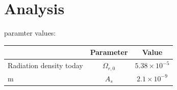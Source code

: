 \section{Analysis}

paramter values:
\begin{center}
    \begin{tabular}{lc|c}
    & Parameter & Value \\
    \hline
    Radiation density today & $\Omega_{r,0}$ & $5.38\times 10^{-5}$\\
    m & $A_s$ & $2.1\times10^{-9}$
\end{tabular}
\end{center}



        
        
            




